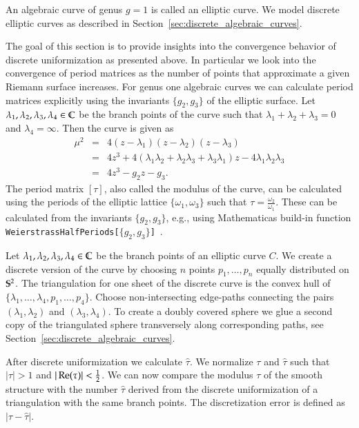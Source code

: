 \documentclass[Thesis]{subfiles}
\begin{document}
An algebraic curve of genus $g=1$ is called an elliptic curve. We model discrete elliptic curves as described in Section~\ref{sec:discrete_algebraic_curves}.

The goal of this section is to provide insights into the convergence behavior of discrete uniformization as presented above. In particular we look into the convergence of period matrices as the number of points that approximate a given Riemann surface increases. For genus one algebraic curves we can calculate period matrices explicitly using the invariants $\{g_2,g_3\}$ of the elliptic surface. Let $\lambda_1,\lambda_2,\lambda_3,\lambda_4\in\C$ be the branch points of the curve such that $\lambda_1+\lambda_2+\lambda_3=0$ and $\lambda_4=\infty$. Then the curve is given as
\begin{eqnarray*}
\mu^2&=&4(z-\lambda_1)(z-\lambda_2)(z-\lambda_3)\\
&=&4z^3+4(\lambda_1\lambda_2+\lambda_2\lambda_3+\lambda_3\lambda_1)z - 4\lambda_1\lambda_2\lambda_3\\
&=&4z^3-g_2z-g_3.
\end{eqnarray*}
The period matrix $[\tau]$, also called the modulus of the curve, can be calculated using the periods of the elliptic lattice $\{\omega_1,\omega_3\}$ such that $\tau = \frac{\omega_2}{\omega_1}$. These can be calculated from the invariants $\{g_2,g_3\}$, e.g., using {\sc Mathematica}s build-in function {\tt WeierstrassHalfPeriods[$\{g_2,g_3\}$]}~\cite{WeierstrassHalfPeriods_website}.

Let $\lambda_1, \lambda_2, \lambda_3, \lambda_4 \in \C$ be the branch points of an elliptic curve $C$. We create a discrete version of the curve by choosing $n$ points $p_1,\ldots,p_n$ equally distributed on $\S^2$. The triangulation for one sheet of the discrete curve is the convex hull of $\{\lambda_1,\ldots,\lambda_4,p_1,\ldots, p_4\}$. Choose non-intersecting edge-paths connecting the pairs $(\lambda_1,\lambda_2)$ and $(\lambda_3,\lambda_4)$. To create a doubly covered sphere we glue a second copy of the triangulated sphere transversely along corresponding paths, see Section~\ref{sec:discrete_algebraic_curves}.

After discrete uniformization we calculate $\hat \tau$. We normalize $\tau$ and $\hat \tau$ such that $|\tau|>1$ and $|\re(\tau)| < \frac{1}{2}$. We can now compare the modulus $\tau$ of the smooth structure with the number $\hat \tau$ derived from the discrete uniformization of a triangulation with the same branch points. The discretization error is defined as $|\tau-\hat \tau|$.
\end{document}
